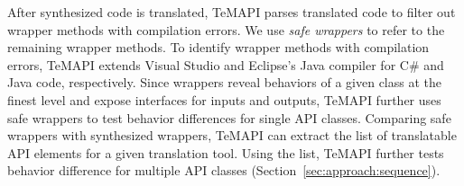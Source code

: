 After synthesized code is translated, TeMAPI parses translated code to filter out wrapper methods with compilation errors. We use \emph{safe wrappers} to refer to the remaining wrapper methods. To identify wrapper methods with compilation errors, TeMAPI extends Visual Studio and Eclipse's Java compiler for C\# and Java code, respectively.
Since wrappers reveal behaviors of a given class at the finest level and expose interfaces for inputs and outputs, TeMAPI further uses safe wrappers to test behavior differences for single API classes. Comparing safe wrappers with synthesized wrappers, TeMAPI can extract the list of translatable API elements for a given translation tool. Using the list, TeMAPI further tests behavior difference for multiple API classes (Section~\ref{sec:approach:sequence}).


%



